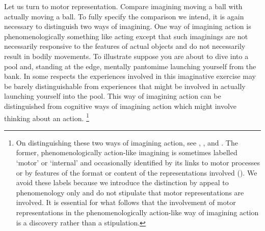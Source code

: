 \documentclass[12pt,\papersize]{extarticle}
\begin{document}
Let us turn to motor representation. 
Compare imagining moving a ball with actually moving a ball.  
To fully specify the comparison we intend, it is again necessary to distinguish two ways of imagining. One way of imagining action is phenomenologically something like acting except that such imaginings are not necessarily responsive to the features of actual objects and do not necessarily result in bodily movements. To illustrate suppose you are about to dive into a pool and, standing at the edge, mentally pantomime launching yourself from the bank. In some respects the experiences involved in this imaginative exercise may be barely distinguishable from experiences that might be involved in actually launching yourself into the pool. This way of imagining action can be distinguished from cognitive ways of imagining action which might involve thinking about an action.%
\footnote{
On distinguishing these two ways of imagining action, see \citet[p.\ 161]{currie:1997_mental}, \citet[p.\ 727]{jeannerod:1995_mental}, and \citet[p.\ 638-9]{kosslyn:2001_neural}. The former, phenomenologically action-like imagining is sometimes labelled `motor' or `internal' and occasionally identified by its links to motor processes or by features of the format or content of the representations involved (\citealp[p.\ 1400]{annett:1995_motor}). We avoid these labels because we introduce the distinction by appeal to phenomenology only and do not stipulate that motor representations are involved. It is essential for what follows that the involvement of motor representations in the phenomenologically action-like way of imagining action is a discovery rather than a stipulation.
}
\end{document}
